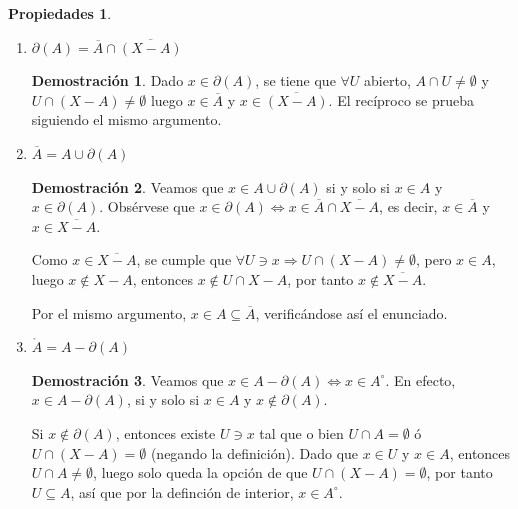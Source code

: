 \documentclass[12pt,twoside]{report}
\theoremstyle{azul}
\theoremstyle{azul2}
\theoremstyle{plain}
\theoremstyle{definition}
\newtheorem*{propi}{Propiedades}
\newtheorem*{dem}{Demostración}
\theoremstyle{remark}
\begin{document}
\begin{propi}\:\justifying
\begin{enumerate}
    \item $\partial (A)=\overline{A}\cap \overline{(X-A)}$
    \begin{dem} \justifying
    Dado $x\in \partial(A)$, se tiene que $\forall U$ abierto, $A\cap U\neq\emptyset$ y $U\cap (X-A)\neq \emptyset$ luego $x\in \overline{A}$ y $x\in \overline{(X-A)}$. El recíproco se prueba siguiendo el mismo argumento.

    \end{dem}
    \item $\overline{A} = A \cup \partial(A)$ \vspace{-3mm}
    \begin{dem} \justifying
        Veamos que $x \in A \cup \partial(A)$ si y solo si $x \in A$ y $x  \in  \partial(A)$. Obsérvese que $x \in \partial(A) \iff x \in \overline{A} \cap \overline{X-A}$, es decir, $x \in \overline{A}$ y $x \in \overline{X-A}$. 

        Como $x \in \overline{X-A}$, se cumple que $\forall U \ni x \Rightarrow U \cap (X-A)\neq \emptyset$, pero $x \in A$, luego $x \nin X-A$, entonces $x \nin U \cap X-A$, por tanto $x \nin \overline{X-A}$.

        Por el mismo argumento, $x \in A \subseteq \overline{A}$, verificándose así el enunciado.
    \end{dem}
    \item $\mathring{A} = A - \partial(A)$ \vspace{-3mm}
    \begin{dem} \justifying
    Veamos que $x \in A-\partial(A) \iff x \in A^{\circ}$. 
    En efecto, $x \in A- \partial(A)$, si y solo si $x \in A$ y $x \nin \partial(A)$. 

    Si $x \nin \partial(A)$, entonces existe $U \ni x$ tal que o bien $U \cap A=\emptyset$ ó $U \cap (X-A)=\emptyset$ (negando la definición). Dado que $x \in U$ y $x \in A$, entonces $U \cap A \neq \emptyset$, luego solo queda la opción de que $U \cap (X-A)=\emptyset$, por tanto $U \subseteq A$, así que por la definción de interior, $x \in A^{\circ}$.
    

\end{dem}
\end{enumerate}
\end{propi}
\end{document}
